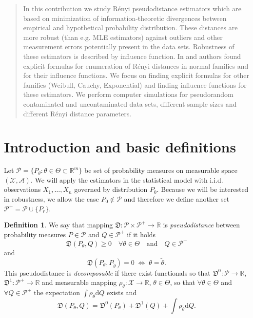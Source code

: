 \documentclass[11pt,a4paper]{article}
\theoremstyle{definition}
\newtheorem{definition}{Definition}[section]
\newcommand{\iid}{i.i.d. }
\begin{document}
\begin{abstract}
In this contribution we study Rényi pseudodistance estimators which are based on minimization of information-theoretic divergences between empirical and hypothetical probability distribution. These distances are more robust (than e.g. MLE estimators) against outliers and other measurement errors potentially present in the data sets. Robustness of these estimators is described by influence function. In \cite{Vajda2009} and \cite{Demut2010} authors found explicit formulas for enumeration of Rényi distances in normal families and for their influence functions. We focus on finding explicit formulas for other families (Weibull, Cauchy, Exponential) and finding influence functions for these estimators. 
We perform computer simulations for pseudorandom contaminated and uncontaminated data sets, different sample sizes and different Rényi distance parameters. 
\end{abstract}

\section{Introduction and basic definitions}
Let $\mathcal{P} = \lbrace P_\theta : \theta \in \Theta \subset \mathbb{R}^m \rbrace$ be set of probability measures on measurable space $\left(\mathcal{X},\mathcal{A}\right)$.
We will apply the estimators in the statistical model with \iid observations $X_1,\ldots,X_n$ governed by distribution $P_0$. 
Because we will be interested in robustness, we allow the case $P_0 \notin \mathcal{P}$ and therefore we define another set $\mathcal{P}^+ = \mathcal{P} \cup \lbrace P_r \rbrace $.

\begin{definition}
	We say that mapping $\mathfrak{D}:\mathcal{P}\times\mathcal{P}^+ \rightarrow \mathbb{R}$ is \emph{pseudodistance} between probability measures $P \in \mathcal{P}$ and $Q \in \mathcal{P}^+$ if it holds
		\begin{equation*}
			\mathfrak{D}(P_\theta,Q) \geq 0 \quad \forall \theta \in \Theta \quad \text{and} \quad Q \in \mathcal{P}^+
		\end{equation*}
		and 
		\begin{equation*}
			\mathfrak{D}(P_\theta,P_{\tilde{\theta}})=0 \; \Leftrightarrow \; \theta=\tilde{\theta}.
		\end{equation*}
	This pseudodistance is \emph{ decomposable} if there exist functionals so that
		 $\mathfrak{D}^0:\mathcal{P}\rightarrow\mathbb{R}$, $ \mathfrak{D}^1:\mathcal{P}^+ \rightarrow \mathbb{R}$ and measurable mapping
		  $\rho_\theta : \mathcal{X} \rightarrow \mathbb{R}$, $ \theta \in \Theta$, so that $\forall \theta \in \Theta$ and $\forall Q \in \mathcal{P}^+$ the expectation $\int{\rho_\theta }\mathrm{d}Q$ exists and
		\begin{equation*}
			\mathfrak{D} (P_\theta, Q) = \mathfrak{D}^0 (P_\theta) + \mathfrak{D}^1 (Q) + \int \rho_\theta \mathrm{d}Q.
		\end{equation*}
\end{definition}
\end{document}
